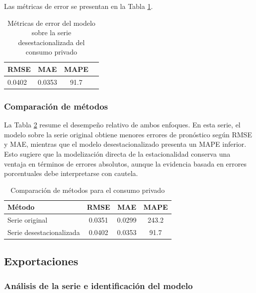 \documentclass[12pt,a4paper]{article}
\begin{document}
	Las métricas de error se presentan en la Tabla \ref{tab:cpriv_sa_metricas}.
	
	\begin{table}[H]
		\centering
		\caption{Métricas de error del modelo sobre la serie desestacionalizada del consumo privado}
		\label{tab:cpriv_sa_metricas}
		\begin{tabular}{lccc}
			\toprule
			RMSE & MAE & MAPE \\
			\midrule
			0.0402 & 0.0353 & 91.7 \\
			\bottomrule
		\end{tabular}
	\end{table}
	
	\subsubsection{Comparación de métodos}
	
	La Tabla \ref{tab:cpriv_comparacion} resume el desempeño relativo de ambos enfoques. En esta serie, el modelo sobre la serie original obtiene menores errores de pronóstico según RMSE y MAE, mientras que el modelo desestacionalizado presenta un MAPE inferior. Esto sugiere que la modelización directa de la estacionalidad conserva una ventaja en términos de errores absolutos, aunque la evidencia basada en errores porcentuales debe interpretarse con cautela.
	
	\begin{table}[H]
		\centering
		\caption{Comparación de métodos para el consumo privado}
		\label{tab:cpriv_comparacion}
		\begin{tabular}{lccc}
			\toprule
			Método & RMSE & MAE & MAPE \\
			\midrule
			Serie original & 0.0351 & 0.0299 & 243.2 \\
			Serie desestacionalizada & 0.0402 & 0.0353 & 91.7 \\
			\bottomrule
		\end{tabular}
	\end{table}
	
	\subsection{Exportaciones}
	
	\subsubsection{Análisis de la serie e identificación del modelo}
	
\end{document}
